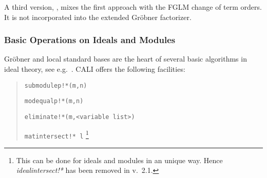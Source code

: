 A third version, , mixes the first approach with the
FGLM change of term orders. It is not incorporated into the extended
Gr\"obner factorizer.

\subsubsection{Basic Operations on Ideals and Modules}

Gr\"obner and local standard bases are the heart of several basic
algorithms in ideal theory, see e.g.\ \cite[6.2.]{Becker:93}. CALI offers
the following facilities:
\begin{quote}
\verb|submodulep!*(m,n)|


\verb|modequalp!*(m,n)|


\verb|eliminate!*(m,<variable list>)| 


\verb|matintersect!* l|
\footnote{This can be done for ideals and
modules in an unique way. Hence \emph{idealintersect!*} has been
removed in v.\ 2.1.}

\end{quote}

